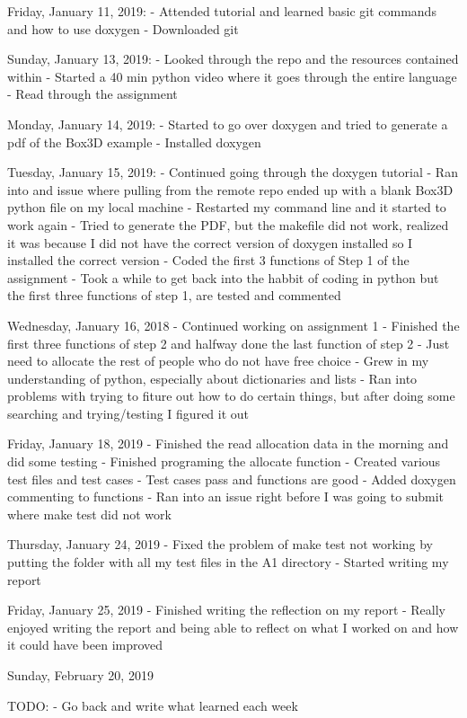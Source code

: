 Friday, January 11, 2019:
	- Attended tutorial and learned basic git commands and how to use doxygen
	- Downloaded git

Sunday, January 13, 2019:
	- Looked through the repo and the resources contained within
	- Started a 40 min python video where it goes through the entire language
	- Read through the assignment 

Monday, January 14, 2019:
	- Started to go over doxygen and tried to generate a pdf of the Box3D example
	- Installed doxygen

Tuesday, January 15, 2019:
	- Continued going through the doxygen tutorial
	- Ran into and issue where pulling from the remote repo ended up with a blank Box3D python file on my local machine
	- Restarted my command line and it started to work again
	- Tried to generate the PDF, but the makefile did not work, realized it was because I did not have the correct version of doxygen installed so I installed the correct version
	- Coded the first 3 functions of Step 1 of the assignment
	- Took a while to get back into the habbit of coding in python but the first three functions of step 1, are tested and commented

Wednesday, January 16, 2018
	- Continued working on assignment 1
	- Finished the first three functions of step 2 and halfway done the last function of step 2
	- Just need to allocate the rest of people who do not have free choice
	- Grew in my understanding of python, especially about dictionaries and lists
	- Ran into problems with trying to fiture out how to do certain things, but after doing some searching and trying/testing I figured it out

Friday, January 18, 2019
	- Finished the read allocation data in the morning and did some testing
	- Finished programing the allocate function
	- Created various test files and test cases
	- Test cases pass and functions are good
	- Added doxygen commenting to functions
	- Ran into an issue right before I was going to submit where make test did not work

Thursday, January 24, 2019
	- Fixed the problem of make test not working by putting the folder with all my test files in the A1 directory
	- Started writing my report

Friday, January 25, 2019
	- Finished writing the reflection on my report
	- Really enjoyed writing the report and being able to reflect on what I worked on and how it could have been improved

Sunday, February 20, 2019
	

TODO:
- Go back and write what learned each week
